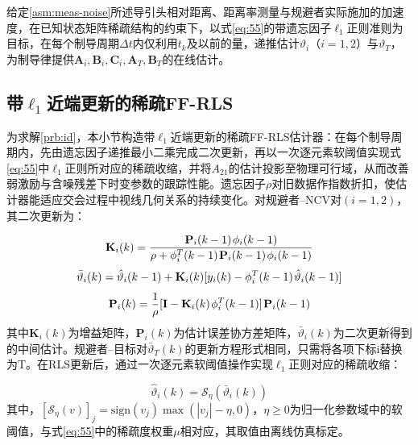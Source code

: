 \begin{problem}[结构稀疏参数辨识]
\label{prb:id}
给定\cref{asm:meas-noise}所述导引头相对距离、距离率测量与规避者实际施加的加速度，在已知状态矩阵稀疏结构的约束下，以式\eqref{eq:55}的带遗忘因子${\ell _1}$正则准则为目标，在每个制导周期$\Delta t$内仅利用${t_k}$及以前的量，递推估计${\vartheta _i}$（$i = 1,2$）与${\vartheta _T}$，为制导律提供${{\mathbf{A}}_i},{{\mathbf{B}}_i},{{\mathbf{C}}_i},{{\mathbf{A}}_T},{{\mathbf{B}}_T}$的在线估计。
\end{problem}
\subsection{带${\ell _1}$近端更新的稀疏FF-RLS}
为求解\cref{prb:id}，本小节构造带${\ell _1}$近端更新的稀疏FF-RLS估计器：在每个制导周期内，先由遗忘因子递推最小二乘完成二次更新，再以一次逐元素软阈值实现式\eqref{eq:55}中${\ell _1}$正则所对应的稀疏收缩，并将${A_{21}}$的估计投影至物理可行域，从而改善弱激励与含噪残差下时变参数的跟踪性能。遗忘因子$\rho$对旧数据作指数折扣，使估计器能适应交会过程中视线几何关系的持续变化。对规避者–NCV对$(i = 1,2)$，其二次更新为：

\begin{equation}
\label{eq:57}
{{\mathbf{K}}_i}(k) = \frac{{{{\mathbf{P}}_i}(k - 1){\kern 1pt} {\phi _i}(k - 1)}}{{\rho  + \phi _i^T(k - 1){\kern 1pt} {{\mathbf{P}}_i}(k - 1){\kern 1pt} {\phi _i}(k - 1)}}
\end{equation}
\begin{equation}
\label{eq:58}
\bar{\vartheta}_{i}(k) = \hat{\vartheta}_{i}(k - 1) + {{\mathbf{K}}_i}(k)[{y_i}(k) - \phi _i^T(k - 1){\kern 1pt} \hat{\vartheta}_{i}(k - 1)]
\end{equation}
\begin{equation}
\label{eq:59}
{{\mathbf{P}}_i}(k) = \frac{1}{\rho }[{\mathbf{I}} - {{\mathbf{K}}_i}(k){\kern 1pt} \phi _i^T(k - 1)]{\kern 1pt} {{\mathbf{P}}_i}(k - 1)
\end{equation}
其中${{\mathbf{K}}_i}(k)$为增益矩阵，${{\mathbf{P}}_i}(k)$为估计误差协方差矩阵，$\bar{\vartheta}_{i}(k)$为二次更新得到的中间估计。规避者–目标对$\bar{\vartheta}_{T}(k)$的更新方程形式相同，只需将各项下标i替换为T。在RLS更新后，通过一次逐元素软阈值操作实现${\ell _1}$正则对应的稀疏收缩：

\begin{equation}
\label{eq:60}
\hat{\vartheta}_{i}(k) = {\mathcal{S}_\eta }(\bar{\vartheta}_{i}(k))
\end{equation}
其中，${[{\mathcal{S}_\eta }(v)]_j} = {\text{sign}}({v_j})\max (|{v_j}| - \eta ,0)$，$\eta  \geqslant 0$为归一化参数域中的软阈值，与式\eqref{eq:55}中的稀疏度权重$\mu $相对应，其取值由离线仿真标定。

